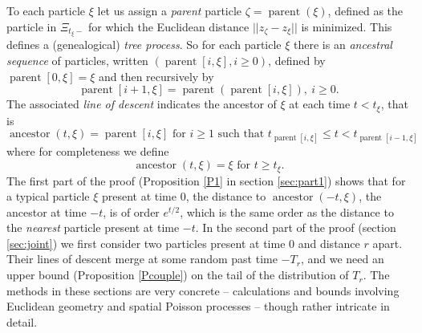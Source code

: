 \documentclass[12pt]{article}
\DeclareMathOperator{\parent}{parent}
\DeclareMathOperator{\ancestor}{ancestor}
\begin{document}
To each particle $\xi$ let us assign a {\em parent} particle $\zeta = \parent(\xi)$, defined as the particle in $\Xi_{t_\xi -}$ 
for which the Euclidean distance $|| z_\zeta - z_\xi||$ is minimized.
This defines a (genealogical) 
{\em tree process}.
So for each particle $\xi$ there is an {\em ancestral sequence} of particles, written
$(\parent[i,\xi], i \ge 0)$, defined by $\parent[0,\xi] = \xi$ and then recursively by 
\[ \parent[i+1,\xi] = \parent( \parent[i, \xi]), \ i \ge 0 . \]
The associated {\em line of descent} indicates the ancestor of $\xi$ at each time $t < t_\xi$, that is
\begin{equation}
 \ancestor(t,\xi) = \parent[i,\xi] 
\mbox{ for $i \ge 1$ such that } t_{\parent[i,\xi] } \le t <  t_{\parent[i-1,\xi] }  
\label{def:ancestor}
\end{equation}
where for completeness we define 
\[  \ancestor(t,\xi) = \xi \mbox{ for } t \ge t_\xi  . \]
The first part of the proof (Proposition \ref{P1} in section \ref{sec:part1}) shows
 that for a typical particle $\xi$ present at time $0$, the distance to $\ancestor(-t,\xi)$, the ancestor at time $-t$,
is of order $e^{t/2}$, which is the same order as the distance to the {\em nearest} particle present at time $-t$.
In the second part of the proof (section \ref{sec:joint}) we first consider 
two particles present at time $0$ and distance $r$ apart.  Their lines of descent merge at some random past time $-T_r$, 
and we need an upper bound (Proposition \ref{Pcouple}) on the tail of the distribution of $T_r$.  
The methods in these sections are very concrete -- calculations and bounds involving  Euclidean geometry and spatial Poisson processes -- 
though rather intricate in detail.
\end{document}
